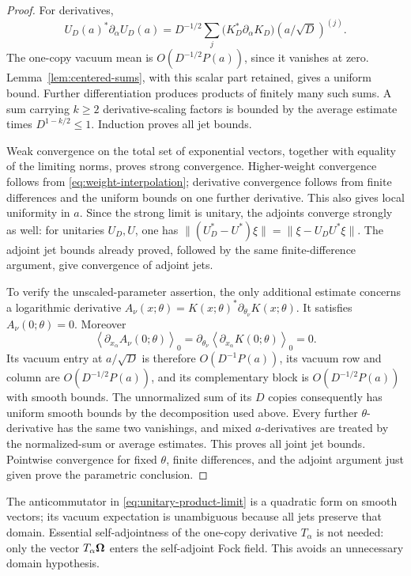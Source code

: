 \begin{proof}
For derivatives,
\[
 U_D(a)^*\partial_\alpha U_D(a)
 =D^{-1/2}\sum_j
 \bigl(K_D^*\partial_\alpha K_D\bigr)(a/\sqrt D)^{(j)}.
\]
The one-copy vacuum mean is $O(D^{-1/2}P(a))$, since it vanishes
at zero.  Lemma~\ref{lem:centered-sums}, with this scalar part
retained, gives a uniform bound.  Further differentiation produces
products of finitely many such sums.  A sum carrying $k\geq2$
derivative-scaling factors is bounded by the average estimate
times $D^{1-k/2}\leq1$.  Induction proves all jet bounds.

Weak convergence on the total set of exponential
vectors, together with equality of the limiting norms, proves
strong convergence.  Higher-weight convergence follows from
\eqref{eq:weight-interpolation}; derivative convergence follows
from finite differences and the uniform bounds on one further
derivative.  This also gives local uniformity in $a$.
Since the strong limit is unitary, the adjoints converge
strongly as well: for unitaries $U_D,U$, one has
$\|(U_D^*-U^*)\xi\|=\|\xi-U_DU^*\xi\|$.
The adjoint jet bounds already proved, followed by the same
finite-difference argument, give convergence of adjoint jets.

To verify the unscaled-parameter assertion, the only additional
estimate concerns a logarithmic derivative
$A_\nu(x;\theta)=K(x;\theta)^*\partial_{\theta_\nu}K(x;\theta)$.
It satisfies $A_\nu(0;\theta)=0$.  Moreover
\[
 \left\langle\partial_{x_\alpha}A_\nu(0;\theta)\right\rangle_0
 =\partial_{\theta_\nu}
       \left\langle\partial_{x_\alpha}K(0;\theta)\right\rangle_0
 =0.
\]
Its vacuum entry at $a/\sqrt D$ is therefore
$O(D^{-1}P(a))$, its vacuum row and column are
$O(D^{-1/2}P(a))$, and its complementary block is
$O(D^{-1/2}P(a))$ with smooth bounds.  The unnormalized
sum of its $D$ copies consequently has uniform smooth
bounds by the decomposition used above.  Every further
$\theta$-derivative has the same two vanishings, and mixed
$a$-derivatives are treated by the normalized-sum or average
estimates.  This proves all joint jet bounds.  Pointwise
convergence for fixed $\theta$, finite differences, and the
adjoint argument just given prove the parametric conclusion.
\end{proof}

\begin{remark}\label{rem:unitary-clt-domains}
The anticommutator in \eqref{eq:unitary-product-limit} is a
quadratic form on smooth vectors; its vacuum expectation is
unambiguous because all jets preserve that domain.  Essential
self-adjointness of the one-copy derivative $T_\alpha$ is not
needed: only the vector $T_\alpha\boldsymbol\Omega$ enters the self-adjoint
Fock field.  This avoids an unnecessary domain hypothesis.
\end{remark}

